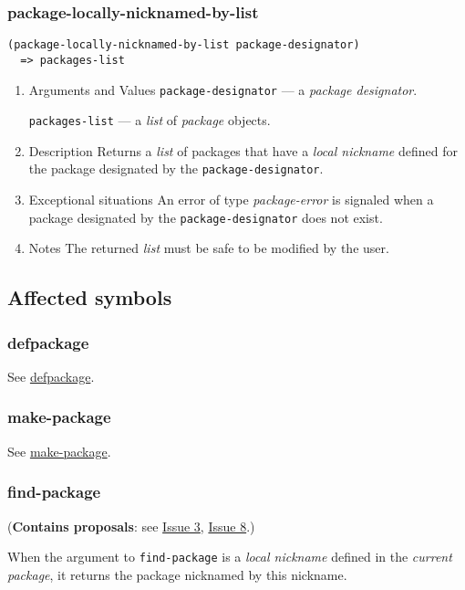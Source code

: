 \documentclass[11pt]{article}
\begin{document}
\subsubsection{package-locally-nicknamed-by-list}
\label{sec:org65f551f}
\begin{verbatim}
(package-locally-nicknamed-by-list package-designator)
  => packages-list
\end{verbatim}
\begin{enumerate}
\item Arguments and Values
\label{sec:org1978c9b}
\texttt{package-designator} --- a \emph{package designator}.

\texttt{packages-list} --- a \emph{list} of \emph{package} objects.
\item Description
\label{sec:org0a3c738}
Returns a \emph{list} of packages that have a \emph{local nickname} defined for the package
designated by the \texttt{package-designator}.
\item Exceptional situations
\label{sec:orge04c89c}
An error of type \emph{package-error} is signaled when a package designated by the
\texttt{package-designator} does not exist.
\item Notes
\label{sec:orge0a0b75}
The returned \emph{list} must be safe to be modified by the user.
\end{enumerate}
\subsection{Affected symbols}
\label{sec:orge2d2d1e}
\subsubsection{defpackage}
\label{sec:org027955d}
See \hyperref[sec:orge74469a]{defpackage}.
\subsubsection{make-package}
\label{sec:org96a3bfb}
See \hyperref[sec:org11654fe]{make-package}.
\subsubsection{find-package}
\label{sec:org98b302b}
(\textbf{Contains proposals}: see \hyperref[sec:orga21bf4f]{Issue 3}, \hyperref[sec:orgd77e416]{Issue 8}.)

When the argument to \texttt{find-package} is a \emph{local nickname} defined in the \emph{current
package}, it returns the package nicknamed by this nickname.
\end{document}
